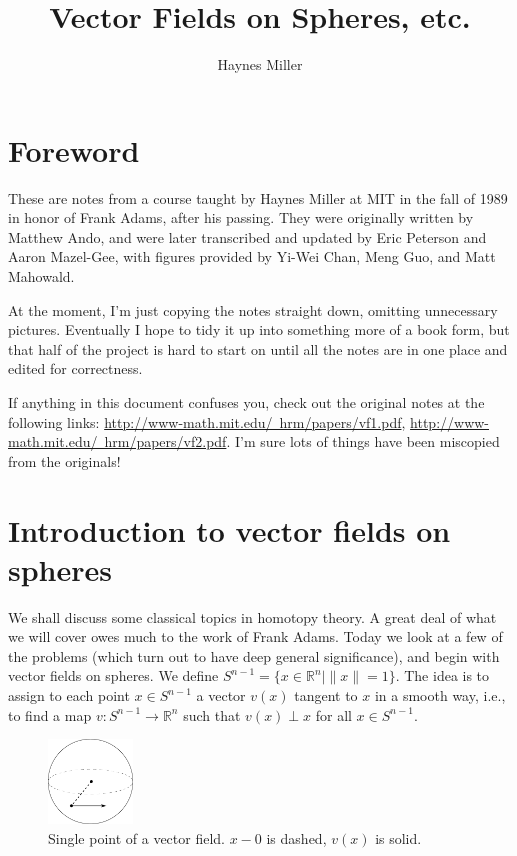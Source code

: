\documentclass{article}
\title{Vector Fields on Spheres, etc.}
\author{Haynes Miller}
\providecommand{\OutputFrontMatter}{}
\providecommand{\OutputForeword}{0}
\providecommand{\OutputIntroductionToVectorFieldsOnSpheres}{1}
\newcommand{\R}{\mathbb{R}}
\begin{document}
\ifx\OutputFrontMatter\undefined\else
\maketitle
\tableofcontents
\fi

\section{Foreword} %
\ifx\OutputForeword\undefined\else
These are notes from a course taught by Haynes Miller at MIT in the fall of 1989 in honor of Frank Adams, after his passing.  They were originally written by Matthew Ando, and were later transcribed and updated by Eric Peterson and Aaron Mazel-Gee, with figures provided by Yi-Wei Chan, Meng Guo, and Matt Mahowald.

At the moment, I'm just copying the notes straight down, omitting unnecessary pictures.  Eventually I hope to tidy it up into something more of a book form, but that half of the project is hard to start on until all the notes are in one place and edited for correctness.

If anything in this document confuses you, check out the original notes at the following links: \href{http://www-math.mit.edu/~hrm/papers/vf1.pdf}{http://www-math.mit.edu/~hrm/papers/vf1.pdf}, \href{http://www-math.mit.edu/~hrm/papers/vf2.pdf}{http://www-math.mit.edu/~hrm/papers/vf2.pdf}.  I'm sure lots of things have been miscopied from the originals!

\fi
\section{Introduction to vector fields on spheres} %
\ifx\OutputIntroductionToVectorFieldsOnSpheres\undefined\else

We shall discuss some classical topics in homotopy theory.  A great deal of what we will cover owes much to the work of Frank Adams.  Today we look at a few of the problems (which turn out to have deep general significance), and begin with vector fields on spheres.  We define $S^{n-1} = \{x \in \R^n \mid \|x\| = 1\}$.  The idea is to assign to each point $x \in S^{n-1}$ a vector $v(x)$ tangent to $x$ in a smooth way, i.e., to find a map $v: S^{n-1} \to \R^n$ such that $v(x) \perp x$ for all $x \in S^{n-1}$.

\begin{figure}
\centering\includegraphics[width=0.2\textwidth]{figures/fig1.pdf}
\caption{\small Single point of a vector field. $x - 0$ is dashed, $v(x)$ is solid.}
\end{figure}
\end{document}
